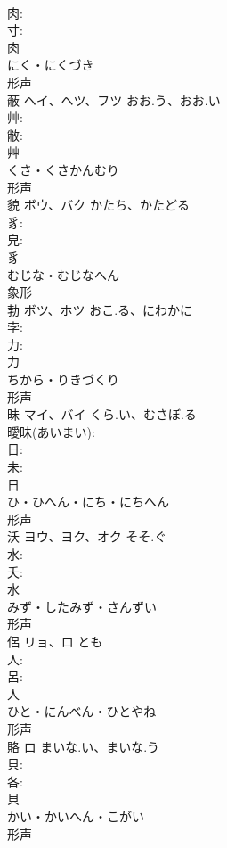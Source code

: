 \documentclass[8pt]{extreport}
\begin{document}
\begin{CJK}{UTF8}{min}
\\	肉: 
\\	寸: 
\\	肉	
\\	にく・にくづき	
\\	形声 
\\	蔽	ヘイ、ヘツ、フツ	おお.う、おお.い		
\\	艸: 
\\	敝: 
\\	艸	
\\	くさ・くさかんむり	
\\	形声 
\\	貌	ボウ、バク	かたち、かたどる		
\\	豸: 
\\	皃: 
\\	豸	
\\	むじな・むじなへん	
\\	象形 
\\	勃	ボツ、ホツ	おこ.る、にわかに		
\\	孛: 
\\	力: 
\\	力	
\\	ちから・りきづくり	
\\	形声 
\\	昧	マイ、バイ	くら.い、むさぼ.る		
\\	曖昧(あいまい): 
\\	日: 
\\	未: 
\\	日	
\\	ひ・ひへん・にち・にちへん	
\\	形声 
\\	沃	ヨウ、ヨク、オク	そそ.ぐ		
\\	水: 
\\	夭: 
\\	水	
\\	みず・したみず・さんずい	
\\	形声 
\\	侶	リョ、ロ	とも		
\\	人: 
\\	呂: 
\\	人	
\\	ひと・にんべん・ひとやね	
\\	形声 
\\	賂	ロ	まいな.い、まいな.う		
\\	貝: 
\\	各: 
\\	貝	
\\	かい・かいへん・こがい	
\\	形声 

\end{CJK}
\end{document}
